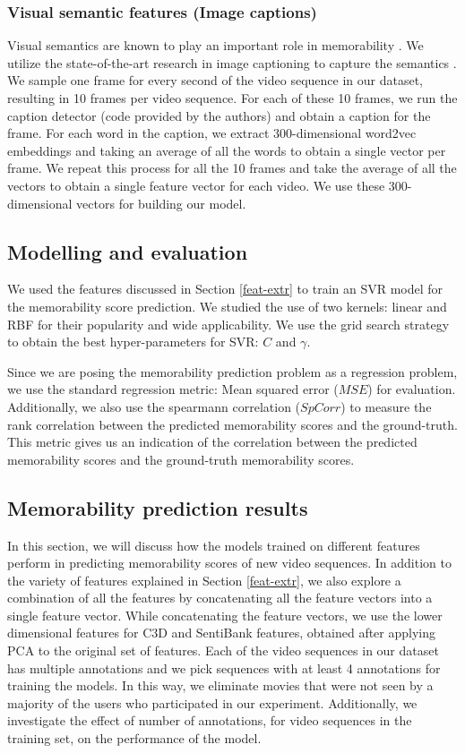 \documentclass[sigconf]{acmart}
\begin{document}
\subsubsection{Visual semantic features (Image captions)}
\label{sem-feat}
Visual semantics are known to play an important role in memorability \cite{sem-mem}.
We utilize the state-of-the-art research in image captioning to capture the semantics \cite{caption-feat}.
We sample one frame for every second of the video sequence in our dataset, resulting in 10 frames per video sequence.
For each of these 10 frames, we run the caption detector (code provided by the authors) and obtain a caption for the frame.
For each word in the caption, we extract 300-dimensional word2vec \cite{word2vec} embeddings and taking an average of all the words to obtain a single vector per frame.
We repeat this process for all the 10 frames and take the average of all the vectors to obtain a single feature vector for each video.
We use these 300-dimensional vectors for building our model.

\subsection{Modelling and evaluation}
\label{model-eval}
We used the features discussed in Section \ref{feat-extr} to train an SVR model for the memorability score prediction. 
We studied the use of two kernels: linear and RBF for their popularity and wide applicability.
We use the grid search strategy to obtain the best hyper-parameters for SVR: $C$ and $\gamma$.

Since we are posing the memorability prediction problem as a regression problem, we use the standard regression metric: Mean squared error ($MSE$) for evaluation.
Additionally, we also use the spearmann correlation ($SpCorr$) to measure the rank correlation between the predicted memorability scores and the ground-truth.
This metric gives us an indication of the correlation between the predicted memorability scores and the ground-truth memorability scores.

\subsection{Memorability prediction results}
\label{pred-res}
In this section, we will discuss how the models trained on different features perform in predicting memorability scores of new video sequences.
In addition to the variety of features explained in Section \ref{feat-extr}, we also explore a combination of all the features by concatenating all the feature vectors into a single feature vector.
While concatenating the feature vectors, we use the lower dimensional features for C3D and SentiBank features, obtained after applying PCA to the original set of features.
Each of the video sequences in our dataset has multiple annotations and we pick sequences with at least 4 annotations for training the models.
In this way, we eliminate movies that were not seen by a majority of the users who participated in our experiment.
Additionally, we investigate the effect of number of annotations, for video sequences in the training set, on the performance of the model.
\end{document}
